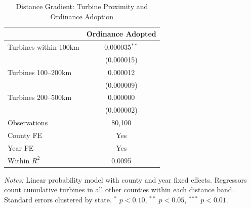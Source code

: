 \begin{table}[htbp]
\centering
\caption{Distance Gradient: Turbine Proximity and Ordinance Adoption}
\label{tab:distance}
\begin{threeparttable}
\begin{tabular}{lc}
\toprule
 & Ordinance Adopted \\
\midrule
Turbines within 100km & 0.000035$^{**}$ \\
 & (0.000015) \\
\addlinespace
Turbines 100--200km & 0.000012 \\
 & (0.000009) \\
\addlinespace
Turbines 200--500km & 0.000000 \\
 & (0.000002) \\
\midrule
Observations & 80,100 \\
County FE & Yes \\
Year FE & Yes \\
Within $R^2$ & 0.0095 \\
\bottomrule
\end{tabular}
\begin{tablenotes}[flushleft]
\small
\item \textit{Notes:} Linear probability model with county and year fixed effects. Regressors count cumulative turbines in all other counties within each distance band. Standard errors clustered by state. $^{*}$ $p<0.10$, $^{**}$ $p<0.05$, $^{***}$ $p<0.01$.
\end{tablenotes}
\end{threeparttable}
\end{table}
